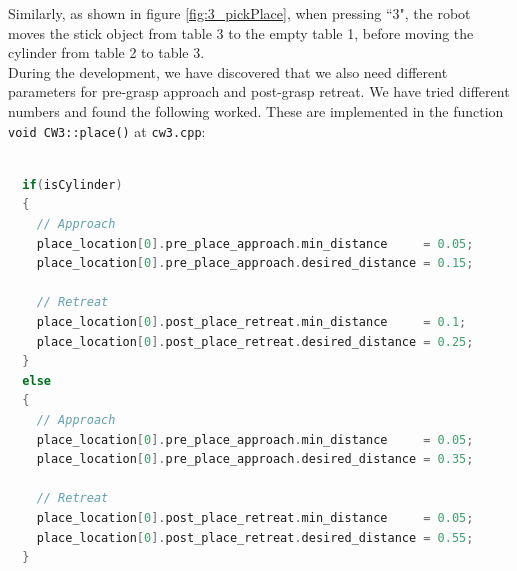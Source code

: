 \documentclass[a4paper,12pt]{article}
\begin{document}
Similarly, as shown in figure  \ref{fig:3_pickPlace}, when pressing ``3", the robot moves the stick object from  table 3 to the empty table 1, before moving the cylinder from table 2 to table 3.\\
 
During the development, we have discovered that we also need different parameters for pre-grasp approach and post-grasp retreat. We have tried different numbers and found the following worked. These are implemented in the function \texttt{void CW3::place()} at \texttt{cw3.cpp}:

\begin{lstlisting}[language=C++,
                   directivestyle={\color{black}}
                   emph={int,char,double,float,unsigned},
                   emphstyle={\color{blue}}
                  ]

  if(isCylinder)
  {
    // Approach
    place_location[0].pre_place_approach.min_distance     = 0.05;
    place_location[0].pre_place_approach.desired_distance = 0.15;

    // Retreat
    place_location[0].post_place_retreat.min_distance     = 0.1;
    place_location[0].post_place_retreat.desired_distance = 0.25;
  }
  else
  {
    // Approach
    place_location[0].pre_place_approach.min_distance     = 0.05;
    place_location[0].pre_place_approach.desired_distance = 0.35;

    // Retreat
    place_location[0].post_place_retreat.min_distance     = 0.05;
    place_location[0].post_place_retreat.desired_distance = 0.55;
  }
\end{lstlisting}


\end{document}
